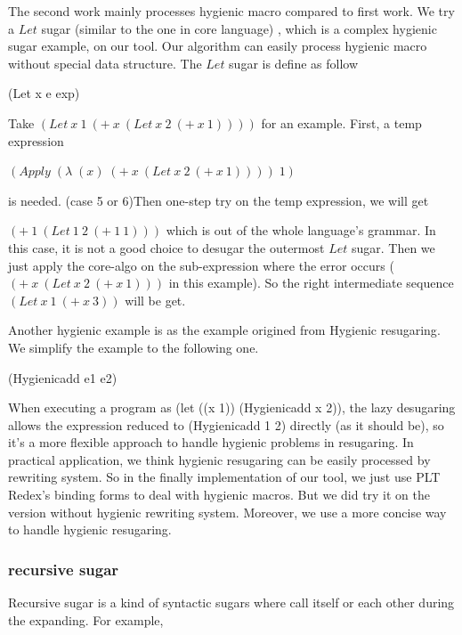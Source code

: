 The second work\cite{hygienic} mainly processes hygienic macro compared to first work. We try a $Let$ sugar (similar to the one in core language) , which is a complex hygienic sugar example, on our tool. Our algorithm can easily process hygienic macro without special data structure. The $Let$ sugar is define as follow
\begin{Codes}
	(Let x e exp) 
\end{Codes}

Take $(Let~x~1~(+~x~(Let~x~2~(+~x~1))))$ for an example. First, a temp expression

$(Apply\;(\lambda\;(x)\;(+~x~(Let~x~2~(+~x~1))))\;1)$

is needed. (case 5 or 6)Then one-step try on the temp expression, we will get

$(+~1~(Let~1~2~(+~1~1)))$ which is out of the whole language's grammar. In this case, it is not a good choice to desugar the outermost $Let$ sugar. Then we just apply the core-algo on the sub-expression where the error occurs ($(+~x~(Let~x~2~(+~x~1)))$ in this example). So the right intermediate sequence $(Let~x~1~(+~x~3))$ will be get.

Another hygienic example is as the example origined from Hygienic resugaring\cite{hygienic}. We simplify the example to the following one.
\begin{Codes}
	(Hygienicadd e1 e2) 
\end{Codes}

When executing a program as (let ((x 1)) (Hygienicadd x 2)), the lazy desugaring allows the expression reduced to (Hygienicadd 1 2) directly (as it should be), so it's a more flexible approach to handle hygienic problems in resugaring.
In practical application, we think hygienic resugaring can be easily processed by rewriting system. So in the finally implementation of our tool, we just use PLT Redex's binding forms to deal with hygienic macros. But we did try it on the version without hygienic rewriting system. Moreover, we use a more concise way to handle hygienic resugaring.

\subsubsection{recursive sugar}
Recursive sugar is a kind of syntactic sugars where call itself or each other during the expanding. For example,

